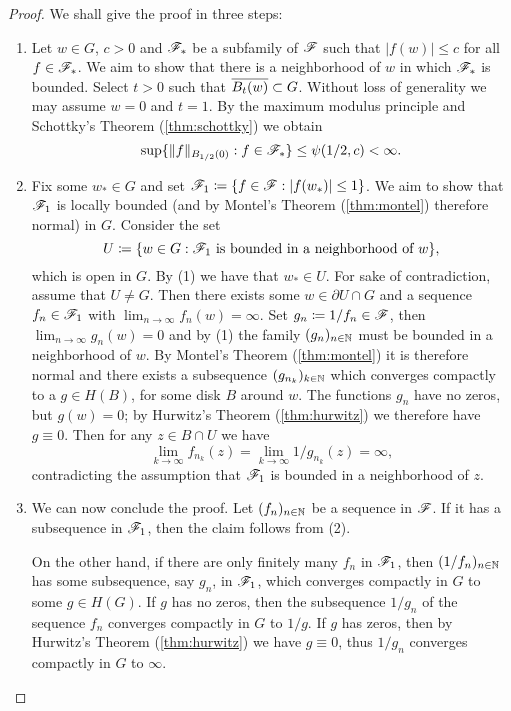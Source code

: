 \begin{proof}
    We shall give the proof in three steps:
    \begin{enumerate}
        \item Let $w \in G$, $c > 0$ and $\mathscr{F}_*$ be a subfamily of $\mathscr{F}$ such that $\vert f(w) \vert \leq c$ for all $f \in \mathscr{F}_*$. We aim to show that there is a neighborhood of $w$ in which $\mathscr{F}_*$ is bounded. Select $t > 0$ such that $\overline{B_t(w)} \subset G$. Without loss of generality we may assume $w = 0$ and $t = 1$. By the maximum modulus principle and Schottky's Theorem (\ref{thm:schottky}) we obtain
        $$ \sup \{ \Vert f \Vert_{B_{1/2}(0)} : f \in \mathscr{F}_* \} \leq \psi(1/2, c) < \infty. $$

        \item Fix some $w_* \in G$ and set $\mathscr{F}_1 \coloneqq \{ f \in \mathscr{F} : \vert f(w_*) \vert \leq 1 \}$. We aim to show that $\mathscr{F}_1$ is locally bounded (and by Montel's Theorem (\ref{thm:montel}) therefore normal) in $G$. Consider the set
        $$ U \coloneqq \{ w \in G : \mathscr{F}_1 \textrm{ is bounded in a neighborhood of } w \}, $$
        which is open in $G$. By (1) we have that $w_* \in U$. For sake of contradiction, assume that $U \neq G$. Then there exists some $w \in \partial U \cap G$ and a sequence $f_n \in \mathscr{F}_1$ with $\lim_{n \to \infty} f_n(w) = \infty$. Set $g_n \coloneqq 1 / f_n \in \mathscr{F}$, then $\lim_{n \to \infty} g_n(w) = 0$ and by (1) the family $(g_n)_{n \in \mathbb{N}}$ must be bounded in a neighborhood of $w$. By Montel's Theorem (\ref{thm:montel}) it is therefore normal and there exists a subsequence $(g_{n_k})_{k \in \mathbb{N}}$ which converges compactly to a $g \in H(B)$, for some disk $B$ around $w$. The functions $g_n$ have no zeros, but $g(w) = 0$; by Hurwitz's Theorem (\ref{thm:hurwitz}) we therefore have $g \equiv 0$. Then for any $z \in B \cap U$ we have
        $$ \lim_{k \to \infty} f_{n_k}(z) = \lim_{k \to \infty} 1 / g_{n_k}(z) = \infty, $$
        contradicting the assumption that $\mathscr{F}_1$ is bounded in a neighborhood of $z$.

        \item We can now conclude the proof. Let $(f_n)_{n \in \mathbb{N}}$ be a sequence in $\mathscr{F}$. If it has a subsequence in $\mathscr{F}_1$, then the claim follows from (2).
        
        On the other hand, if there are only finitely many $f_n$ in $\mathscr{F}_1$, then $(1 / f_n)_{n \in \mathbb{N}}$ has some subsequence, say $g_n$, in $\mathscr{F}_1$, which converges compactly in $G$ to some $g \in H(G)$. If $g$ has no zeros, then the subsequence $1 / g_n$ of the sequence $f_n$ converges compactly in $G$ to $1 / g$. If $g$ has zeros, then by Hurwitz's Theorem (\ref{thm:hurwitz}) we have $g \equiv 0$, thus $1 / g_n$ converges compactly in $G$ to $\infty$.
    \end{enumerate}
\end{proof}

